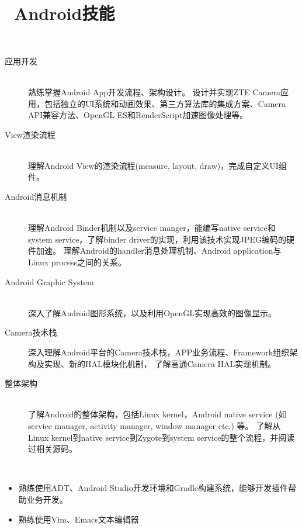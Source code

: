 \documentclass{resume}
\begin{document}
\section{\faCogs\ Android技能}
\begin{description}[parsep=0.5ex]
  \item[Android系统] \
    \begin{description}
         \item[应用开发] \ \\ 熟练掌握Android App开发流程、架构设计。
            设计并实现ZTE Camera应用，包括独立的UI系统和动画效果、第三方算法库的集成方案、Camera API兼容方法、OpenGL ES和RenderScript加速图像处理等。
         \item[View渲染流程] \ \\ 理解Android View的渲染流程(measure, layout, draw)，完成自定义UI组件。
         \item[Android消息机制] \ \\ 理解Android Binder机制以及service manger，能编写native service和system service，了解binder driver的实现，利用该技术实现JPEG编码的硬件加速。
            理解Android的handler消息处理机制、Android application与Linux process之间的关系。
         \item [Android Graphic System] \ \\ 深入了解Android图形系统，以及利用OpenGL实现高效的图像显示。
         \item [Camera技术栈] 深入理解Android平台的Camera技术栈，APP业务流程、Framework组织架构及实现、新的HAL模块化机制，
            了解高通Camera HAL实现机制。
         \item[整体架构] \ \\ 了解Android的整体架构，包括Linux kernel，Android native service
            (如service manager, activity manager, window manager etc.) 等。
            了解从Linux kernel到native service到Zygote到system service的整个流程，并阅读过相关源码。
    \end{description}
    
  \item[开发工具] \
    \begin{itemize}
        \item 熟练使用ADT、Android Studio开发环境和Gradle构建系统，能够开发插件帮助业务开发。
        \item 熟练使用Vim、Emacs文本编辑器
    \end{itemize}
\end{description}
\end{document}
